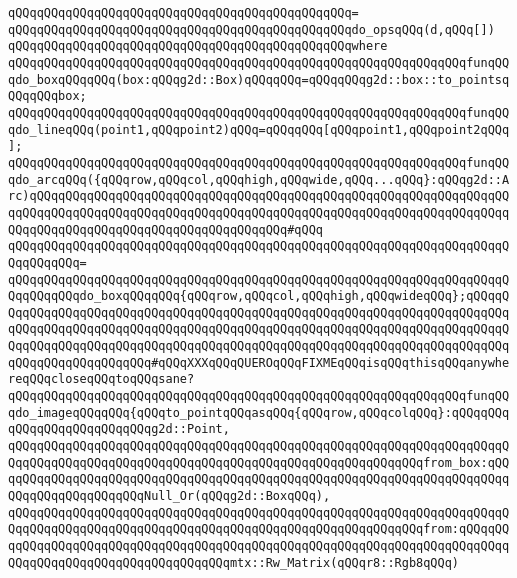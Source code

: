 \verb|qQQqqQQqqQQqqQQqqQQqqQQqqQQqqQQqqQQqqQQqqQQqqQQq=|\newline
\verb|qQQqqQQqqQQqqQQqqQQqqQQqqQQqqQQqqQQqqQQqqQQqqQQqdo_opsqQQq(d,qQQq[])|\newline
\verb|qQQqqQQqqQQqqQQqqQQqqQQqqQQqqQQqqQQqqQQqqQQqqQQqwhere|\newline
\verb|qQQqqQQqqQQqqQQqqQQqqQQqqQQqqQQqqQQqqQQqqQQqqQQqqQQqqQQqqQQqqQQqfunqQQqdo_boxqQQqqQQq(box:qQQqg2d::Box)qQQqqQQq=qQQqqQQqg2d::box::to_pointsqQQqqQQqbox;|\newline
\verb|qQQqqQQqqQQqqQQqqQQqqQQqqQQqqQQqqQQqqQQqqQQqqQQqqQQqqQQqqQQqqQQqfunqQQqdo_lineqQQq(point1,qQQqpoint2)qQQq=qQQqqQQq[qQQqpoint1,qQQqpoint2qQQq];|\newline
\newline
\verb|qQQqqQQqqQQqqQQqqQQqqQQqqQQqqQQqqQQqqQQqqQQqqQQqqQQqqQQqqQQqqQQqfunqQQqdo_arcqQQq({qQQqrow,qQQqcol,qQQqhigh,qQQqwide,qQQq...qQQq}:qQQqg2d::Arc)qQQqqQQqqQQqqQQqqQQqqQQqqQQqqQQqqQQqqQQqqQQqqQQqqQQqqQQqqQQqqQQqqQQqqQQqqQQqqQQqqQQqqQQqqQQqqQQqqQQqqQQqqQQqqQQqqQQqqQQqqQQqqQQqqQQqqQQqqQQqqQQqqQQqqQQqqQQqqQQqqQQqqQQqqQQqqQQq#qQQq|\newline
\verb|qQQqqQQqqQQqqQQqqQQqqQQqqQQqqQQqqQQqqQQqqQQqqQQqqQQqqQQqqQQqqQQqqQQqqQQqqQQqqQQq=|\newline
\verb|qQQqqQQqqQQqqQQqqQQqqQQqqQQqqQQqqQQqqQQqqQQqqQQqqQQqqQQqqQQqqQQqqQQqqQQqqQQqqQQqdo_boxqQQqqQQq{qQQqrow,qQQqcol,qQQqhigh,qQQqwideqQQq};qQQqqQQqqQQqqQQqqQQqqQQqqQQqqQQqqQQqqQQqqQQqqQQqqQQqqQQqqQQqqQQqqQQqqQQqqQQqqQQqqQQqqQQqqQQqqQQqqQQqqQQqqQQqqQQqqQQqqQQqqQQqqQQqqQQqqQQqqQQqqQQqqQQqqQQqqQQqqQQqqQQqqQQqqQQqqQQqqQQqqQQqqQQqqQQqqQQqqQQqqQQqqQQqqQQqqQQqqQQqqQQqqQQqqQQqqQQq#qQQqXXXqQQqQUEROqQQqFIXMEqQQqisqQQqthisqQQqanywhereqQQqcloseqQQqtoqQQqsane?|\newline
\newline
\verb|qQQqqQQqqQQqqQQqqQQqqQQqqQQqqQQqqQQqqQQqqQQqqQQqqQQqqQQqqQQqqQQqfunqQQqdo_imageqQQqqQQq{qQQqto_pointqQQqasqQQq{qQQqrow,qQQqcolqQQq}:qQQqqQQqqQQqqQQqqQQqqQQqqQQqg2d::Point,|\newline
\verb|qQQqqQQqqQQqqQQqqQQqqQQqqQQqqQQqqQQqqQQqqQQqqQQqqQQqqQQqqQQqqQQqqQQqqQQqqQQqqQQqqQQqqQQqqQQqqQQqqQQqqQQqqQQqqQQqqQQqqQQqqQQqqQQqfrom_box:qQQqqQQqqQQqqQQqqQQqqQQqqQQqqQQqqQQqqQQqqQQqqQQqqQQqqQQqqQQqqQQqqQQqqQQqqQQqqQQqqQQqqQQqqQQqNull_Or(qQQqg2d::BoxqQQq),|\newline
\verb|qQQqqQQqqQQqqQQqqQQqqQQqqQQqqQQqqQQqqQQqqQQqqQQqqQQqqQQqqQQqqQQqqQQqqQQqqQQqqQQqqQQqqQQqqQQqqQQqqQQqqQQqqQQqqQQqqQQqqQQqqQQqqQQqfrom:qQQqqQQqqQQqqQQqqQQqqQQqqQQqqQQqqQQqqQQqqQQqqQQqqQQqqQQqqQQqqQQqqQQqqQQqqQQqqQQqqQQqqQQqqQQqqQQqqQQqqQQqqQQqmtx::Rw_Matrix(qQQqr8::Rgb8qQQq)|\newline
